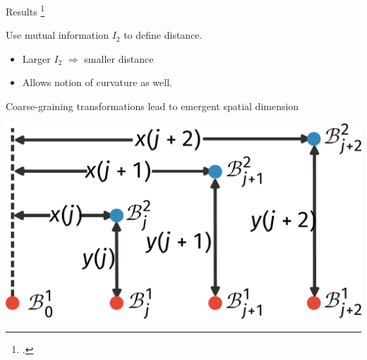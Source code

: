 \documentclass[aspectratio=169,t]{beamer}
\begin{document}
\begin{frame}{Results}
\footcite{van2010building,Patra2023}
\begin{minipage}{0.53\textwidth}
	Use mutual information \(I_2\) to define \alert{distance}.
\begin{itemize}
	\item Larger \(I_2\) \(\Longrightarrow\) smaller distance\\[10pt]
	\item Allows notion of \alert{curvature} as well.\\[10pt]
\end{itemize}
Coarse-graining transformations lead to \alert{emergent} spatial dimension
\end{minipage}
\hspace*{\fill}
\begin{minipage}{0.43\textwidth}
	\includegraphics[width=\textwidth]{curvature-scheme.pdf}
\end{minipage}


\end{frame}
\end{document}
